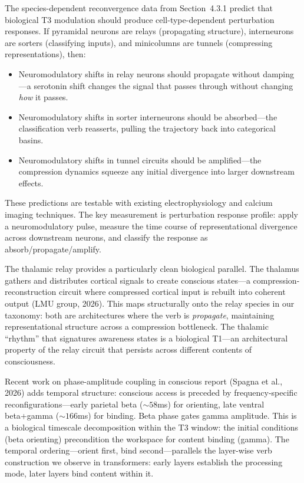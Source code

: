 \documentclass[12pt]{article}
\begin{document}
The species-dependent reconvergence data from Section~4.3.1 predict that biological T3 modulation should produce cell-type-dependent perturbation responses. If pyramidal neurons are relays (propagating structure), interneurons are sorters (classifying inputs), and minicolumns are tunnels (compressing representations), then:

\begin{itemize}
\item Neuromodulatory shifts in relay neurons should propagate without damping---a serotonin shift changes the signal that passes through without changing \emph{how} it passes.
\item Neuromodulatory shifts in sorter interneurons should be absorbed---the classification verb reasserts, pulling the trajectory back into categorical basins.
\item Neuromodulatory shifts in tunnel circuits should be amplified---the compression dynamics squeeze any initial divergence into larger downstream effects.
\end{itemize}

These predictions are testable with existing electrophysiology and calcium imaging techniques. The key measurement is perturbation response profile: apply a neuromodulatory pulse, measure the time course of representational divergence across downstream neurons, and classify the response as absorb/propagate/amplify.

The thalamic relay provides a particularly clean biological parallel. The thalamus gathers and distributes cortical signals to create conscious states---a compression-reconstruction circuit where compressed cortical input is rebuilt into coherent output (LMU group, 2026). This maps structurally onto the relay species in our taxonomy: both are architectures where the verb is \emph{propagate}, maintaining representational structure across a compression bottleneck. The thalamic ``rhythm'' that signatures awareness states is a biological T1---an architectural property of the relay circuit that persists across different contents of consciousness.

Recent work on phase-amplitude coupling in conscious report (Spagna et al., 2026) adds temporal structure: conscious access is preceded by frequency-specific reconfigurations---early parietal beta (${\sim}58$ms) for orienting, late ventral beta+gamma (${\sim}166$ms) for binding. Beta phase gates gamma amplitude. This is a biological timescale decomposition within the T3 window: the initial conditions (beta orienting) precondition the workspace for content binding (gamma). The temporal ordering---orient first, bind second---parallels the layer-wise verb construction we observe in transformers: early layers establish the processing mode, later layers bind content within it.
\end{document}
